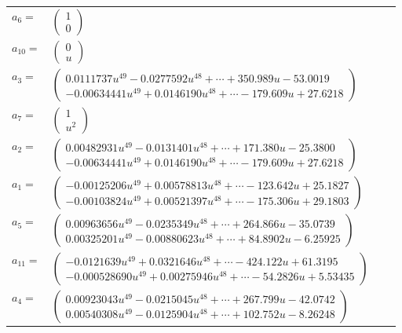 \documentclass[1p]{elsarticle_modified}
\theoremstyle{definition}
\begin{document}
\begin{tabular}{m{7pt} m{180pt} m{7pt} m{180pt} }
\flushright $a_{6}=$&$\begin{pmatrix}1\\0\end{pmatrix}$ \\
\flushright $a_{10}=$&$\begin{pmatrix}0\\u\end{pmatrix}$ \\
\flushright $a_{3}=$&$\begin{pmatrix}0.0111737 u^{49}-0.0277592 u^{48}+\cdots+350.989 u-53.0019\\-0.00634441 u^{49}+0.0146190 u^{48}+\cdots-179.609 u+27.6218\end{pmatrix}$ \\
\flushright $a_{7}=$&$\begin{pmatrix}1\\u^2\end{pmatrix}$ \\
\flushright $a_{2}=$&$\begin{pmatrix}0.00482931 u^{49}-0.0131401 u^{48}+\cdots+171.380 u-25.3800\\-0.00634441 u^{49}+0.0146190 u^{48}+\cdots-179.609 u+27.6218\end{pmatrix}$ \\
\flushright $a_{1}=$&$\begin{pmatrix}-0.00125206 u^{49}+0.00578813 u^{48}+\cdots-123.642 u+25.1827\\-0.00103824 u^{49}+0.00521397 u^{48}+\cdots-175.306 u+29.1803\end{pmatrix}$ \\
\flushright $a_{5}=$&$\begin{pmatrix}0.00963656 u^{49}-0.0235349 u^{48}+\cdots+264.866 u-35.0739\\0.00325201 u^{49}-0.00880623 u^{48}+\cdots+84.8902 u-6.25925\end{pmatrix}$ \\
\flushright $a_{11}=$&$\begin{pmatrix}-0.0121639 u^{49}+0.0321646 u^{48}+\cdots-424.122 u+61.3195\\-0.000528690 u^{49}+0.00275946 u^{48}+\cdots-54.2826 u+5.53435\end{pmatrix}$ \\
\flushright $a_{4}=$&$\begin{pmatrix}0.00923043 u^{49}-0.0215045 u^{48}+\cdots+267.799 u-42.0742\\0.00540308 u^{49}-0.0125904 u^{48}+\cdots+102.752 u-8.26248\end{pmatrix}$ \\

\end{tabular}
\end{document}
